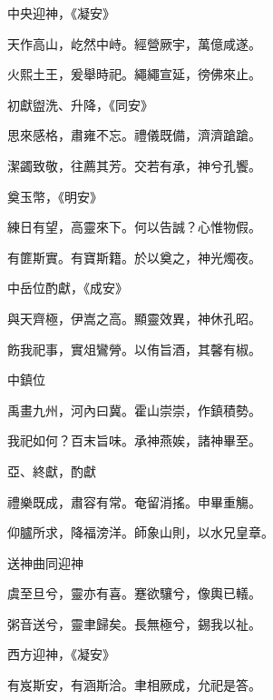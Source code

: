 \begin{pinyinscope}
 中央迎神，《凝安》



 天作高山，屹然中峙。經營厥宇，萬億咸遂。



 火熙土王，爰舉時祀。繩繩宣延，徬佛來止。



 初獻盥洗、升降，《同安》



 思來感格，肅雍不忘。禮儀既備，濟濟蹌蹌。



 潔蠲致敬，往薦其芳。交若有承，神兮孔饗。



 奠玉幣，《明安》



 練日有望，高靈來下。何以告誠？心惟物假。



 有篚斯實。有寶斯籍。於以奠之，神光燭夜。



 中岳位酌獻，《成安》



 與天齊極，伊嵩之高。顯靈效異，神休孔昭。



 飭我祀事，實俎鸞膋。以侑旨酒，其馨有椒。



 中鎮位



 禹畫九州，河內曰冀。霍山崇崇，作鎮積勢。



 我祀如何？百末旨味。承神燕娭，諸神畢至。



 亞、終獻，酌獻



 禮樂既成，肅容有常。奄留消搖。申畢重觴。



 仰臚所求，降福滂洋。師象山則，以水兄皇章。



 送神曲同迎神



 虞至旦兮，靈亦有喜。蹇欲驤兮，像輿已轙。



 粥音送兮，靈聿歸矣。長無極兮，錫我以祉。



 西方迎神，《凝安》



 有岌斯安，有涵斯洽。聿相厥成，允祀是答。




\end{pinyinscope}
